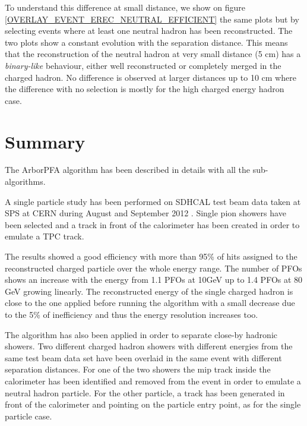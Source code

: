 \documentclass[cits]{JINST}
\begin{document}
To understand this difference at small distance, we show on figure \ref{OVERLAY_EVENT_EREC_NEUTRAL_EFFICIENT} the same plots but by selecting events where at least one neutral hadron has been reconstructed. The two plots show a constant evolution with the separation distance. This means that the reconstruction of the neutral hadron at very small distance (5 cm) has a \textit{binary-like} behaviour, either well reconstructed or completely merged in the charged hadron. No difference is observed at larger distances up to 10 cm where the difference with no selection is mostly for the high charged energy hadron case. 

\newpage
\section{Summary}

The ArborPFA algorithm has been described in details with all the sub-algorithms. 

A single particle study has been performed on SDHCAL test beam data taken at SPS at CERN during August and September 2012 \cite{sdhcal-paper}. Single pion showers have been selected and a track in front of the calorimeter has been created in order to emulate a TPC track.

The results showed a good efficiency with more than 95\% of hits assigned to the reconstructed charged particle over the whole energy range. The number of PFOs shows an increase with the energy from 1.1 PFOs at 10GeV up to 1.4 PFOs at 80 GeV growing linearly. The reconstructed energy of the single charged hadron is close to the one applied before running the algorithm with a small decrease due to the 5\% of inefficiency and thus the energy resolution increases too.

The algorithm has also been applied in order to separate close-by hadronic showers. Two different charged hadron showers with different energies from the same test beam data set have been overlaid in the same event with different separation distances. For one of the two showers the mip track inside the calorimeter has been identified and removed from the event in order to emulate a neutral hadron particle. For the other particle, a track has been generated in front of the calorimeter and pointing on the particle entry point, as for the single particle case. 
\end{document}
